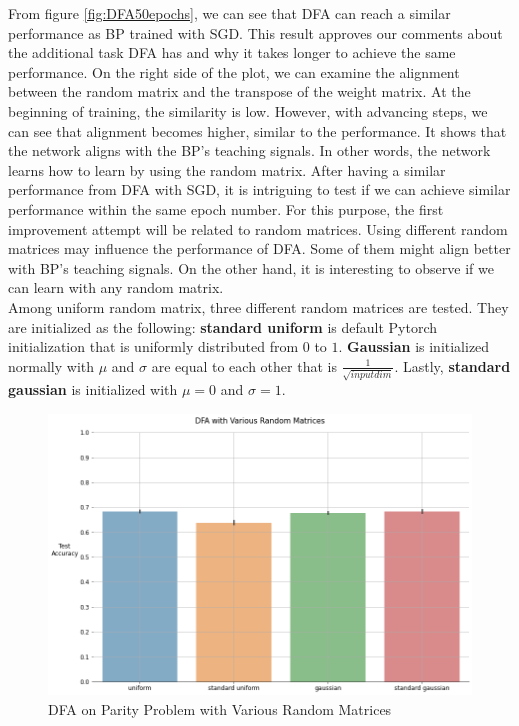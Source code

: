 \documentclass[a4paper, nobind]{templates/ociamthesis}
\begin{document}
\noindent From figure \ref{fig:DFA50epochs}, we can see that DFA can reach a similar performance as BP trained with SGD. This result approves our comments about the additional task DFA has and why it takes longer to achieve the same performance. On the right side of the plot, we can examine the alignment between the random matrix and the transpose of the weight matrix. At the beginning of training, the similarity is low. However, with advancing steps, we can see that alignment becomes higher, similar to the performance. It shows that the network aligns with the BP's teaching signals. In other words, the network learns how to learn by using the random matrix.
\noindent After having a similar performance from DFA with SGD, it is intriguing to test if we can achieve similar performance within the same epoch number. For this purpose, the first improvement attempt will be related to random matrices. Using different random matrices may influence the performance of DFA. Some of them might align better with BP's teaching signals. On the other hand, it is interesting to observe if we can learn with any random matrix.\\
Among uniform random matrix, three different random matrices are tested. They are initialized as the following: \textbf{standard uniform} is default Pytorch initialization that is uniformly distributed from \(0\) to \(1\). \textbf{Gaussian} is initialized normally with \(\mu\) and \(\sigma\) are equal to each other that is \(\frac{1}{\sqrt{input dim}}\). Lastly, \textbf{standard gaussian} is initialized with \(\mu=0\) and \(\sigma=1\).

\begin{figure}

{\centering \includegraphics[width=1\linewidth]{figures/3_k3_DFA_RandomMatrices} 

}

\caption{DFA on Parity Problem with Various Random Matrices}\label{fig:DFARandomMatrices}
\end{figure}
\end{document}
